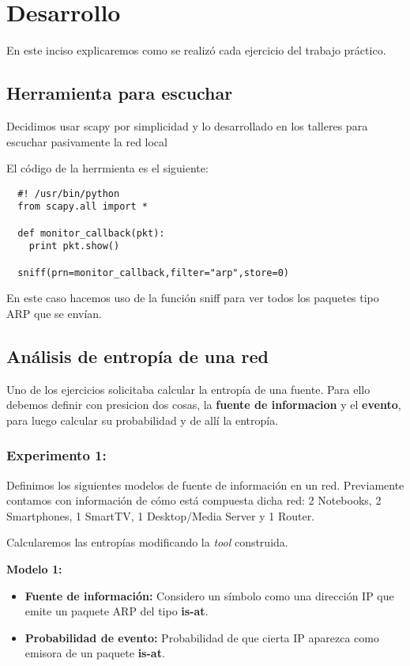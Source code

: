 \section{Desarrollo}
En este inciso explicaremos como se realizó cada ejercicio del trabajo práctico.

\subsection{Herramienta para escuchar}
Decidimos usar scapy por simplicidad y lo desarrollado en los talleres para escuchar pasivamente la red local

El código de la herrmienta es el siguiente:

\begin{center}
 \begin{verbatim}
  #! /usr/bin/python
  from scapy.all import *

  def monitor_callback(pkt):
    print pkt.show()

  sniff(prn=monitor_callback,filter="arp",store=0)
 \end{verbatim}

\end{center}

En este caso hacemos uso de la función sniff para ver todos los paquetes tipo ARP que se envían.

\subsection{Análisis de entropía de una red}
Uno de los ejercicios solicitaba calcular la entropía de una fuente.
Para ello debemos definir con presicion dos cosas, la \textbf{fuente de informacion} y el \textbf{evento}, para luego calcular su probabilidad
y de allí la entropía.

\subsubsection{Experimento 1:}

Definimos los siguientes modelos de fuente de información en un red. Previamente contamos con información de cómo está compuesta dicha red: 2 Notebooks, 2 Smartphones, 1 SmartTV, 1 Desktop/Media Server y 1 Router.

Calcularemos las entropías modificando la \textit{tool} construida. 

\textbf{Modelo 1:}
\begin{itemize}
\item \textbf{Fuente de información:} Considero un símbolo como una dirección IP que emite un paquete ARP del tipo \textbf{is-at}.
\item \textbf{Probabilidad de evento:} Probabilidad de que cierta IP aparezca como emisora de un paquete \textbf{is-at}.
\end{itemize}

